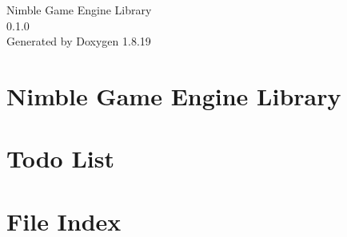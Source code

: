\let\mypdfximage\pdfximage\def\pdfximage{\immediate\mypdfximage}\documentclass[twoside]{book}
\newcommand{\+}{\discretionary{\mbox{\scriptsize$\hookleftarrow$}}{}{}}
\newcommand{\clearemptydoublepage}{%
  \newpage{\pagestyle{empty}\cleardoublepage}%
}
\begin{document}
\hypersetup{pageanchor=false,
             bookmarksnumbered=true,
             pdfencoding=unicode
            }
\begin{titlepage}
\vspace*{7cm}
\begin{center}%
{\Large Nimble Game Engine Library \\[1ex]\large 0.\+1.\+0 }\\
\vspace*{1cm}
{\large Generated by Doxygen 1.8.19}\\
\end{center}
\end{titlepage}
\clearemptydoublepage
{}
\tableofcontents
\clearemptydoublepage
{}
\hypersetup{pageanchor=true}

\chapter{Nimble Game Engine Library}
\label{index}\hypertarget{index}{}
\chapter{Todo List}
\label{todo}

\chapter{File Index}

\end{document}
